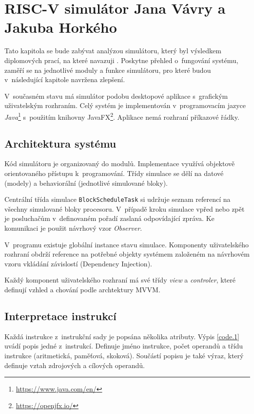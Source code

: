 
\chapter{RISC-V simulátor Jana Vávry a Jakuba Horkého}
\label{chapteroldsolution}

Tato kapitola se bude zabývat analýzou simulátoru, který byl výsledkem diplomových prací, na které navazuji \cite{horkySim, vavraSim}.
Poskytne přehled o~fungování systému, zaměří se na jednotlivé moduly a funkce simulátoru, pro které budou v~následující kapitole navržena zlepšení.

V~současném stavu má simulátor podobu desktopové aplikace s~grafickým uživatelským rozhraním.
Celý systém je implementován v~programovacím jazyce \emph{Java}\footnote{\url{https://www.java.com/en/}} s~použitím knihovny JavaFX\footnote{\url{https://openjfx.io/}}.
Aplikace nemá rozhraní příkazové řádky.

\section{Architektura systému}

Kód simulátoru je organizovaný do modulů.
Implementace využívá objektově orientovaného přístupu k~programování.
Třídy simulace se dělí na datové (modely) a behaviorální (jednotlivé simulované bloky).

Centrální třída simulace \texttt{BlockScheduleTask} si udržuje seznam referencí na všechny simulované bloky procesoru.
V~případě kroku simulace vpřed nebo zpět je posluchačům v~definovaném pořadí zaslaná odpovídající zpráva.
Ke komunikaci je použit návrhový vzor \emph{Observer}.

V~programu existuje globální instance stavu simulace.
Komponenty uživatelského rozhraní obdrží reference na potřebné objekty systémem založeném na návrhovém vzoru vkládání závislostí (Dependency Injection).

Každý komponent uživatelského rozhraní má své třídy \emph{view} a \emph{controler}, které definují vzhled a chování podle archtektury MVVM.

\section{Interpretace instrukcí}
\label{interpret}

Každá instrukce z~instrukční sady je popsána několika atributy.
Výpis \ref{code.1} uvádí popis jedné z~instrukcí.
Definuje jméno instrukce, počet operandů a třídu instrukce (aritmetická, paměťová, skoková).
Součástí popisu je také výraz, který definuje vztah zdrojových a cílových operandů.

